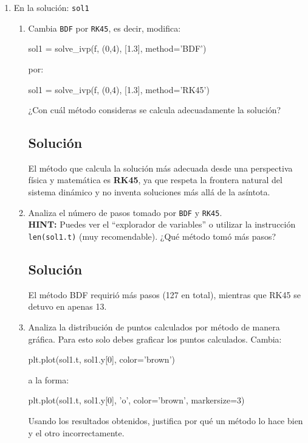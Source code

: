 \begin{enumerate}[label=\arabic*., leftmargin=*]
\begin{enumerate}[label=(\alph*), leftmargin=*]
        Este es un método explícito de Runge-Kutta de orden 5(4), el cual controla el error asumiendo la precisión de un método de cuarto orden, pero realiza los pasos de integración utilizando una fórmula precisa de quinto orden.

        \item En la solución: \texttt{sol1}
        \begin{enumerate}[label=\roman*., leftmargin=*]
            \item Cambia \texttt{BDF} por \texttt{RK45}, es decir, modifica:
            \begin{terminal}
                sol1 = solve\_ivp(f, (0,4), [1.3], method='BDF')
            \end{terminal}
            por:
            \begin{terminal}
                sol1 = solve\_ivp(f, (0,4), [1.3], method='RK45')
            \end{terminal}
            ¿Con cuál método consideras se calcula adecuadamente la solución?
            \subsection*{Solución}
            El método que calcula la solución más adecuada desde una perspectiva física y matemática es \textbf{RK45}, ya que respeta la frontera natural del sistema dinámico y no inventa soluciones más allá de la asíntota.

            \item Analiza el número de pasos tomado por \texttt{BDF} y \texttt{RK45}. \\
            \textbf{HINT:} Puedes ver el ``explorador de variables'' o utilizar la instrucción \texttt{len(sol1.t)} (muy recomendable). ¿Qué método tomó más pasos?
            \subsection*{Solución}
            El método BDF requirió más pasos (127 en total), mientras que RK45 se detuvo en apenas 13.

            \item Analiza la distribución de puntos calculados por método de manera gráfica. Para esto solo debes graficar los puntos calculados. Cambia:
            \begin{terminal}
                plt.plot(sol1.t, sol1.y[0], color='brown')
            \end{terminal}
            a la forma:
            \begin{terminal}
                plt.plot(sol1.t, sol1.y[0], 'o', color='brown', markersize=3)
            \end{terminal}
            Usando los resultados obtenidos, justifica por qué un método lo hace bien y el otro incorrectamente.

\end{enumerate}
\end{enumerate}
\end{enumerate}
